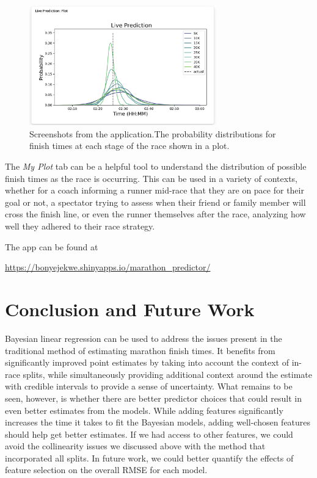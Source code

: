 \documentclass[USenglish,twocolumn]{article}
\theoremstyle{dgthm}
\theoremstyle{dgdef}
\begin{document}
\begin{figure}[ht]
    \centering
    \includegraphics[width=3.2in]{app_screenshot2.png}
    \caption{Screenshots from the application.The probability distributions for finish times at each stage of the race shown in a plot.}
\end{figure}


The \emph{My Plot} tab can be a helpful tool to understand the distribution of possible finish times as the race is occurring. This can be used in a variety of contexts, whether for a coach informing a runner mid-race that they are on pace for their goal or not, a spectator trying to assess when their friend or family member will cross the finish line, or even the runner themselves after the race, analyzing how well they adhered to their race strategy. 

The app can be found at
\begin{center}
  \url{https://bonyejekwe.shinyapps.io/marathon_predictor/}
\end{center}


\section{Conclusion and Future Work}

Bayesian linear regression can be used to address the issues present in the traditional method of estimating marathon finish times. It benefits from significantly improved point estimates by taking into account the context of in-race splits, while simultaneously providing additional context around the estimate with credible intervals to provide a sense of uncertainty. What remains to be seen, however, is whether there are better predictor choices that could result in even better estimates from the models. While adding features significantly increases the time it takes to fit the Bayesian models, adding well-chosen features should help get better estimates. If we had access to other features, we could avoid the collinearity issues we discussed above with the method that incorporated all splits. In future work, we could better quantify the effects of feature selection on the overall RMSE for each model.
\end{document}
